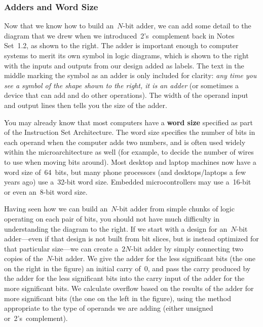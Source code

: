 \subsubsection{Adders and Word Size}\vspace{12pt}

\begin{minipage}{4.95in}
Now that we know how to build an~\mbox{$N$-bit} adder, we can add
some detail to the diagram that we drew when we 
introduced~2's~complement back in Notes Set~1.2, as shown to the right.
%
The adder is important enough to computer systems to merit its own
symbol in logic diagrams, which is shown to the right with the inputs
and outputs from our design added as labels.  The text in the middle
marking the symbol as an adder is only included for clarity: {\em any time 
you see a symbol of the shape shown to the right, it is an adder} (or 
sometimes a device that can add and do other operations).  The width 
of the operand input and output lines then tells you the size of the 
adder.
\end{minipage}\hspace{.25in}%
\begin{minipage}{1.3in}
\end{minipage}

You may already know that most computers have a {\bf word size}
specified as part of the Instruction Set Architecture.  The word
size specifies the number of bits in each operand when the computer
adds two numbers, and is often used widely within the 
microarchitecture as well (for example, to decide the number of 
wires to use when moving bits around).  Most desktop and laptop machines
now have a word size of~64~bits, but many phone processors (and
desktops/laptops a few years ago) use a~\mbox{32-bit} word size.
Embedded microcontrollers may use a~\mbox{16-bit} or even 
an~\mbox{8-bit} word size.

\begin{minipage}{4.1in}
Having seen how we can build an~\mbox{$N$-bit} adder from simple
chunks of logic operating on each pair of bits, you should not have
much difficulty in understanding the diagram to the right.
%
If we start with a design for an~\mbox{$N$-bit} adder---even if that
design is not built from bit slices, but is instead optimized for
that particular size---we can create a~\mbox{$2N$-bit} adder by 
simply connecting two copies of the~\mbox{$N$-bit} adder.  We give
the adder for the less significant bits (the one on the right
in the figure) an initial carry of~0,
and pass the carry produced by the adder for the less significant
bits into the carry input of the adder for the more significant
bits.  We calculate overflow based on the results of the adder
for more significant bits (the one on the left in the figure), 
using the method appropriate to the 
type of operands we are adding (either unsigned or~2's~complement).
\end{minipage}\hspace{.25in}%
\begin{minipage}{2.15in}
\end{minipage}

